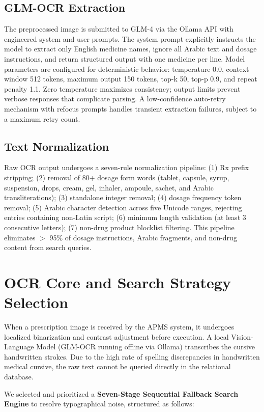 \documentclass[12pt,a4paper,oneside]{report}
\begin{document}
\subsection{GLM-OCR Extraction}\label{glm-ocr-extraction}
The preprocessed image is submitted to GLM-4 via the Ollama API with engineered system and user prompts. The system prompt explicitly instructs the model to extract only English medicine names, ignore all Arabic text and dosage instructions, and return structured output with one medicine per line. Model parameters are configured for deterministic behavior: temperature 0.0, context window 512 tokens, maximum output 150 tokens, top-k 50, top-p 0.9, and repeat penalty 1.1. Zero temperature maximizes consistency; output limits prevent verbose responses that complicate parsing. A low-confidence auto-retry mechanism with refocus prompts handles transient extraction failures, subject to a maximum retry count.

\subsection{Text Normalization}\label{text-normalization}
Raw OCR output undergoes a seven-rule normalization pipeline: (1) Rx prefix stripping; (2) removal of 80+ dosage form words (tablet, capsule, syrup, suspension, drops, cream, gel, inhaler, ampoule, sachet, and Arabic transliterations); (3) standalone integer removal; (4) dosage frequency token removal; (5) Arabic character detection across five Unicode ranges, rejecting entries containing non-Latin script; (6) minimum length validation (at least 3 consecutive letters); (7) non-drug product blocklist filtering. This pipeline eliminates $>$ 95\% of dosage instructions, Arabic fragments, and non-drug content from search queries.

\section{OCR Core and Search Strategy
Selection}\label{ocr-core-and-search-strategy-selection}

When a prescription image is received by the APMS system, it undergoes
localized binarization and contrast adjustment before execution. A
local Vision-Language Model (GLM-OCR running offline via Ollama)
transcribes the cursive handwritten strokes. Due to the high rate of
spelling discrepancies in handwritten medical cursive, the raw text
cannot be queried directly in the relational database.

We selected and prioritized a \textbf{Seven-Stage Sequential Fallback
Search Engine} to resolve typographical noise, structured as follows:
\end{document}
